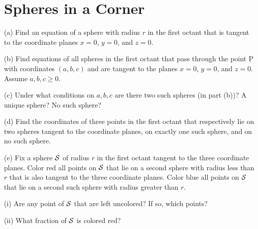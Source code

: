 \documentclass{ximera}
\begin{document}
\section{Spheres in a Corner}

\begin{question} \label{Q3:Coordinates}
(a) Find an equation of a sphere with radius $r$ in the first octant that is tangent to the coordinate planes $x=0$, $y=0$, and $z=0$.

(b) Find equations of all spheres in the first octant that pass through the point P with coordinates $(a,b,c)$ and are tangent to the  planes $x=0$, $y=0$, and $z=0$. Assume $a,b,c \geq 0$.

(c) Under what conditions on $a,b,c$ are there two such spheres (in part (b))? A unique sphere? No such sphere?

(d) Find the coordinates of three points in the first octant that respectively lie on two spheres tangent to the coordinate planes, on exactly one such sphere, and on no such sphere.

(e) Fix a sphere ${\cal S}$ of radius $r$ in the first octant tangent to the three coordinate planes. Color red all points on ${\cal S}$ that lie on a second sphere with radius less than $r$ that is also tangent to the three coordinate planes. Color blue all points on ${\cal S}$ that lie on a second such sphere with radius greater than $r$.

(i) Are any point of ${\cal S}$ that are left uncolored? If so, which points?

(ii) What fraction of ${\cal S}$ is colored red?



 
\begin{onlineOnly}
    \begin{center}
\end{center}
\end{onlineOnly}

\end{question}


 
\begin{onlineOnly}
    \begin{center}
\end{center}
\end{onlineOnly}
\end{document}
